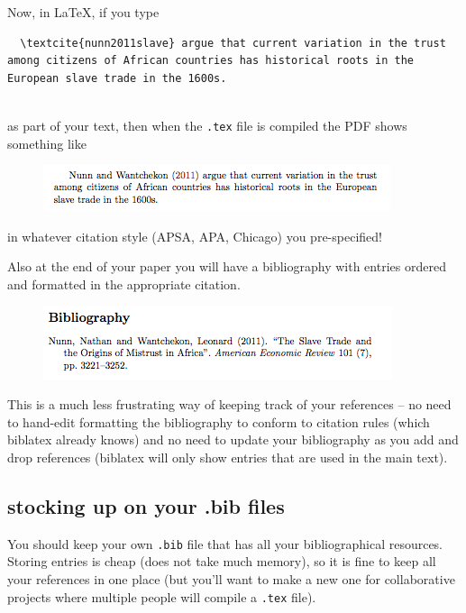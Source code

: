 \documentclass[]{book}
\theoremstyle{definition}
\theoremstyle{definition}
\theoremstyle{definition}
\theoremstyle{remark}
\begin{document}
Now, in LaTeX, if you type

\begin{verbatim}
  \textcite{nunn2011slave} argue that current variation in the trust among citizens of African countries has historical roots in the European slave trade in the 1600s.
  
\end{verbatim}

as part of your text, then when the \texttt{.tex} file is compiled the
PDF shows something like

\begin{figure}
\centering
\includegraphics{images/biblatex_inline.png}
\caption{}
\end{figure}

in whatever citation style (APSA, APA, Chicago) you pre-specified!

Also at the end of your paper you will have a bibliography with entries
ordered and formatted in the appropriate citation.

\begin{figure}
\centering
\includegraphics{images/biblatex_bibliography.png}
\caption{}
\end{figure}

This is a much less frustrating way of keeping track of your references
-- no need to hand-edit formatting the bibliography to conform to
citation rules (which biblatex already knows) and no need to update your
bibliography as you add and drop references (biblatex will only show
entries that are used in the main text).

\subsection{stocking up on your .bib
files}\label{stocking-up-on-your-.bib-files}

You should keep your own \texttt{.bib} file that has all your
bibliographical resources. Storing entries is cheap (does not take much
memory), so it is fine to keep all your references in one place (but
you'll want to make a new one for collaborative projects where multiple
people will compile a \texttt{.tex} file).
\end{document}
